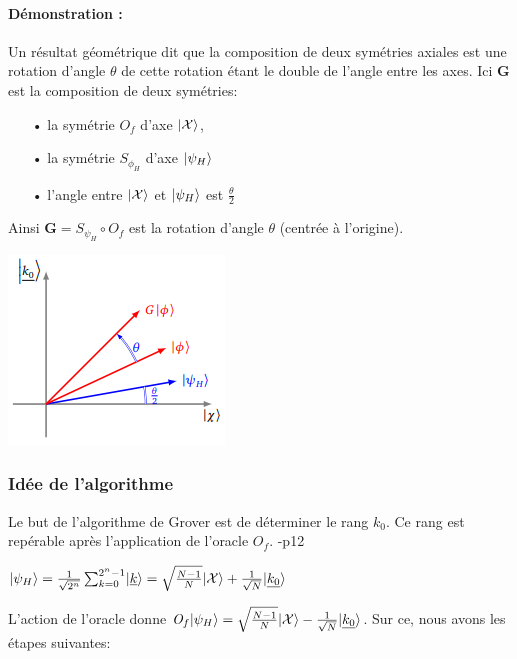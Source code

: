 \documentclass[12pt,openany]{report}
\DeclarePairedDelimiter\ket{\lvert}{\rangle}
\begin{document}
\paragraph{Démonstration :} Un résultat géométrique dit que la composition de deux symétries axiales est une rotation d'angle $\theta $ de cette rotation étant le double de l'angle entre les axes. 
Ici \textbf{G} est la composition de deux symétries:
\begin{itemize}
\item[•] la symétrie $\mathit{O}_f $ d'axe $\ket{\mathcal{X}} $,
\item[•] la symétrie $\mathit{S}_{\phi_H} $ d'axe $\ket{\psi_H} $
\item[•] l'angle entre $\ket{\mathcal{X}} $ et $\ket{\psi_H} $ est $\frac{\theta}{2} $
\end{itemize}
Ainsi $\mathbf{G}=\mathit{S}_{\psi_H}\circ \mathit{O}_f $ est la rotation d'angle $\theta $ (centrée à l'origine).
\begin{center}
\includegraphics[scale=1.2]{./grover_3}
\end{center}

\subsubsection{Idée de l'algorithme }
Le but de l'algorithme de Grover est de déterminer le rang $k_0$. Ce rang est repérable après l'application de l'oracle $\mathit{O}_f$. \cite{Arnaud}-p12
\begin{center}
$\ket{\psi_H}=\frac{1}{\sqrt{2^n}}\sum_{k=0}^{2^n-1}\ket{\underline{k}}=\sqrt{\frac{N-1}{N}}  \ket{\mathcal{X}} +\frac{1}{\sqrt{N}}\ket{\underline{k_0}}  $
\end{center}
L'action de l'oracle donne $\mathit{O}_f \ket{\psi_H}=\sqrt{\frac{N-1}{N}}  \ket{\mathcal{X}}-\frac{1}{\sqrt{N}}\ket{\underline{k_0}}  $. Sur ce, nous avons les étapes suivantes:
\end{document}
